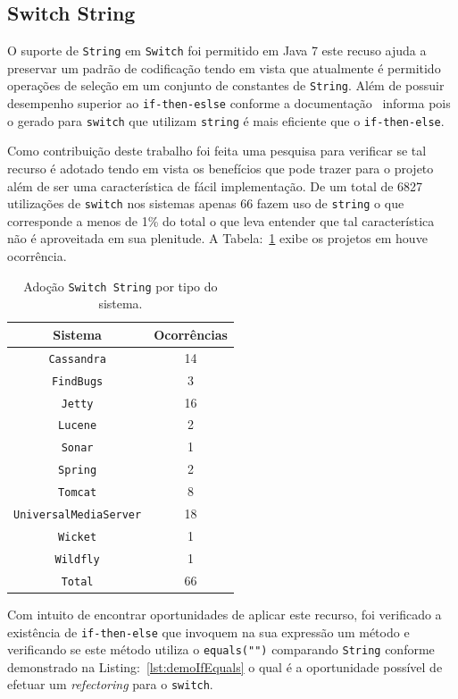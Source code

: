 \subsection{Switch String}

O suporte de \texttt{String} em \texttt{Switch} foi permitido em Java 7 este recuso ajuda a preservar um padrão de codificação tendo em vista que atualmente é permitido operações de seleção em um conjunto de constantes de \texttt{String}. Além de possuir desempenho superior ao \texttt{if-then-eslse} conforme a documentação~\cite{docSwitch} informa pois o gerado para \texttt{switch} que utilizam \texttt{string} é mais eficiente que o \texttt{if-then-else}.

Como contribuição deste trabalho foi feita uma pesquisa para verificar se tal recurso é adotado tendo em vista os benefícios que pode trazer para o projeto além de ser uma característica de fácil implementação. De um total de \num{6827} utilizações de \texttt{switch} nos sistemas apenas \num{66} fazem uso de \texttt{string} o que corresponde a menos de \num{1}\% do total o que leva entender que tal característica não é aproveitada em sua plenitude. A Tabela:~\ref{tab:adocaoSwitchString} exibe os projetos em houve ocorrência.


\begin{table}[ht] \footnotesize
	\centering
	\caption{Adoção \texttt{Switch String} por tipo do sistema.}
	\begin{tabular}{cc}
		\hline
		Sistema & Ocorrências \\ 
		\hline \hline
		\texttt{Cassandra} & 14 \\ 
		\texttt{FindBugs} & 3 \\ 
		\texttt{Jetty} & 16 \\
		\texttt{Lucene} & 2 \\
		\texttt{Sonar} & 1 \\
		\texttt{Spring} & 2 \\
		\texttt{Tomcat} & 8 \\
		\texttt{UniversalMediaServer} & 18 \\
		\texttt{Wicket} & 1 \\
		\texttt{Wildfly} & 1 \\	 \hline
		\texttt{Total} & 66 \\ \hline
	\end{tabular}
	\label{tab:adocaoSwitchString} %
\end{table}


Com intuito de encontrar oportunidades de aplicar este recurso, foi verificado a existência de \texttt{if-then-else} que invoquem na sua expressão um método e verificando se este método utiliza o \texttt{equals("")} comparando \texttt{String} conforme demonstrado na Listing:~\ref{lst:demoIfEquals} o qual é a oportunidade possível de efetuar um  \textit{refectoring} para o \texttt{switch}.

